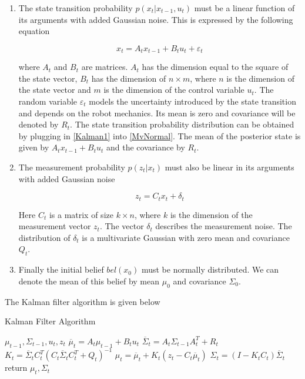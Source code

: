 \documentclass[conference]{IEEEtran}
\begin{document}
\begin{enumerate}
\item The state transition probability $p(x_t|x_{t-1}, u_t)$ must be a linear function of its arguments with added Gaussian noise. This is expressed by the following equation

 \begin{equation}\label{Kalman1}
x_t = A_tx_{t-1} + B_tu_t + \varepsilon_t
\end{equation}

where $A_t$ and $B_t$ are matrices. $A_t$ has the dimension equal to the square of the state vector, $B_t$ has the dimension of $n \times m$, where $n$ is the dimension of the state vector and $m$ is the dimension of the control variable $u_t$. The random variable $\varepsilon_t$ models the uncertainty introduced by the state transition and depends on the robot mechanics. Its mean is zero and covariance will be denoted by $R_t$. The state transition probability distribution can be obtained by plugging in \ref{Kalman1} into \ref{MvNormal}. The mean of the posterior state is given by $A_tx_{t-1} + B_tu_t$ and the covariance by $R_t$.\\

\item The measurement probability $p(z_t|x_t)$ must also be linear in its arguments with added Gaussian noise

 \begin{equation}\label{Kalman2}
z_t = C_tx_{t} + \delta_t
\end{equation}

Here $C_t$ is a matrix of size $k \times n$, where $k$ is the dimension of the measurement vector $z_t$. The vector $\delta_t$ describes the measurement noise. The distribution of $\delta_t$ is a multivariate Gaussian with zero mean and covariance $Q_t$.\\

\item Finally the initial belief $bel(x_0)$ must be normally distributed. We can denote the mean of this belief by mean $\mu_0$ and covariance $\Sigma_0$.
\end{enumerate}

The Kalman filter algorithm is given below

\begin{minipage}{\linewidth}
  \begin{algorithm}[H]
    \caption{Kalman Filter Algorithm}\label{AlgKalman}
    \begin{algorithmic}[1]
       {$\mu_{t-1},\Sigma_{t-1}, u_t,z_t$}
	\State $\overline \mu_t = A_t \mu_{t-1} + B_t u_t$
	\State $\overline \Sigma_t= A_t \Sigma_{t-1} A_t^T + R_t$  
	\State $K_t = \overline \Sigma_t C_t^T{(C_t \overline \Sigma_t C_t^T + Q_t)}^{-1}$
	\State $\mu_t = \overline \mu_t + K_t(z_t - C_t \overline \mu_t)$
	\State $\Sigma_t = (I - K_t C_t) \overline \Sigma_t$
	\State return $\mu_t, \Sigma_t$
      \EndProcedure
    \end{algorithmic}
  \end{algorithm}
\end{minipage}\\\\
\end{document}
